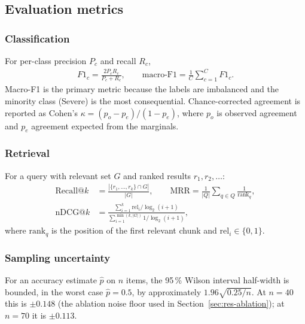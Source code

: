 \subsection{Evaluation metrics}
\label{sec:metrics}
\subsubsection{Classification}
For per-class precision $P_c$ and recall $R_c$,
\begin{align}
	F1_c = \frac{2P_cR_c}{P_c+R_c}, \qquad \text{macro-F1} = \frac{1}{C}\sum_{c=1}^{C}F1_c. \label{eq:f1}
\end{align}
Macro-F1 is the primary metric because the labels are imbalanced and the minority class (Severe) is the most consequential. Chance-corrected agreement is reported as Cohen's $\kappa=(p_o-p_e)/(1-p_e)$, where $p_o$ is observed agreement and $p_e$ agreement expected from the marginals.

\subsubsection{Retrieval}
For a query with relevant set $G$ and ranked results $r_1, r_2, \dots$:
\begin{align}
	\text{Recall@}k &= \frac{|\{r_1,\dots,r_k\}\cap G|}{|G|}, \qquad
	\text{MRR} = \frac{1}{|Q|}\sum_{q\in Q}\frac{1}{\mathrm{rank}_q}, \\
	\text{nDCG@}k &= \frac{\sum_{i=1}^{k} \mathrm{rel}_i/\log_2(i+1)}{\sum_{i=1}^{\min(k,|G|)} 1/\log_2(i+1)},
\end{align}
where $\mathrm{rank}_q$ is the position of the first relevant chunk and $\mathrm{rel}_i\in\{0,1\}$.

\subsubsection{Sampling uncertainty}
For an accuracy estimate $\hat p$ on $n$ items, the 95\,\% Wilson interval half-width is bounded, in the worst case $\hat p=0.5$, by approximately $1.96\sqrt{0.25/n}$. At $n=40$ this is $\pm0.148$ (the ablation noise floor used in Section~\ref{sec:res-ablation}); at $n=70$ it is $\pm0.113$.
